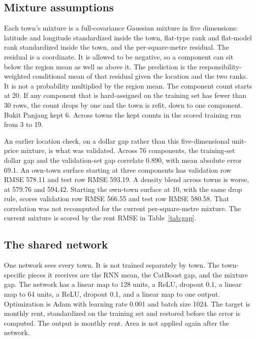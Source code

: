 \documentclass[11pt]{article}
\begin{document}
\subsection{Mixture assumptions}

Each town's mixture is a full-covariance Gaussian mixture in five dimensions: latitude and longitude standardized inside the town, flat-type rank and flat-model rank standardized inside the town, and the per-square-metre residual.
The residual is a coordinate.
It is allowed to be negative, so a component can sit below the region mean as well as above it.
The prediction is the responsibility-weighted conditional mean of that residual given the location and the two ranks.
It is not a probability multiplied by the region mean.
The component count starts at 20.
If any component that is hard-assigned on the training set has fewer than 30 rows, the count drops by one and the town is refit, down to one component.
Bukit Panjang kept 6.
Across towns the kept counts in the scored training run from 3 to 19.

An earlier location check, on a dollar gap rather than this five-dimensional unit-price mixture, is what was validated.
Across 76 components, the training-set dollar gap and the validation-set gap correlate 0.890, with mean absolute error 69.1.
An own-town surface starting at three components has validation row RMSE 578.11 and test row RMSE 593.19.
A density blend across towns is worse, at 579.76 and 594.42.
Starting the own-town surface at 10, with the same drop rule, scores validation row RMSE 566.55 and test row RMSE 580.58.
That correlation was not recomputed for the current per-square-metre mixture.
The current mixture is scored by the rent RMSE in Table~\ref{tab:gap}.

\subsection{The shared network}

One network sees every town.
It is not trained separately by town.
The town-specific pieces it receives are the RNN mean, the CatBoost gap, and the mixture gap.
The network has a linear map to 128 units, a ReLU, dropout 0.1, a linear map to 64 units, a ReLU, dropout 0.1, and a linear map to one output.
Optimization is Adam with learning rate 0.001 and batch size 1024.
The target is monthly rent, standardized on the training set and restored before the error is computed.
The output is monthly rent.
Area is not applied again after the network.
\end{document}
